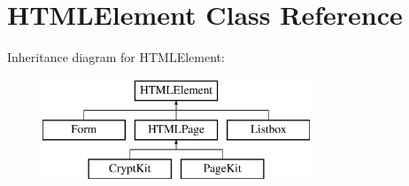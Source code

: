 \hypertarget{class_h_t_m_l_element}{\section{H\-T\-M\-L\-Element Class Reference}
\label{class_h_t_m_l_element}
}
Inheritance diagram for H\-T\-M\-L\-Element\-:\begin{figure}[H]
\begin{center}
\leavevmode
\includegraphics[height=3.000000cm]{class_h_t_m_l_element}
\end{center}
\end{figure}
